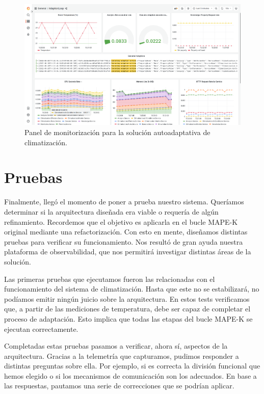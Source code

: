 \begin{landscape}

  \begin{figure}[htb]
    \centering
    \includegraphics[scale=0.37]{cap_despliegue/images/Grafana-panel-monitorizacion}
    \caption{Panel de monitorización para la solución autoadaptativa de climatización.}
    \label{fig:grafana-panel-monitorizacion}
  \end{figure}

\end{landscape}


\section{Pruebas}

Finalmente, llegó el momento de poner a prueba nuestro sistema. Queríamos determinar si la arquitectura diseñada era viable o requería de algún refinamiento. Recordemos que el objetivo es aplicarla en el bucle MAPE-K  original mediante una refactorización. Con esto en mente, diseñamos distintas pruebas para verificar su funcionamiento. Nos resultó de gran ayuda nuestra plataforma de observabilidad, que nos permitirá investigar distintas áreas de la solución.

Las primeras pruebas que ejecutamos fueron las relacionadas con el funcionamiento del sistema de climatización. Hasta que este no se estabilizará, no podíamos emitir ningún juicio sobre la arquitectura. En estos tests verificamos que, a partir de las mediciones de temperatura, debe ser capaz de completar el proceso de adaptación. Esto implica que todas las etapas del bucle MAPE-K se ejecutan correctamente.

Completadas estas pruebas pasamos a verificar, ahora sí, aspectos de la arquitectura. Gracias a la telemetría que capturamos, pudimos responder a distintas preguntas sobre ella. Por ejemplo, si es correcta la división funcional que hemos elegido o si los mecanismos de comunicación son los adecuados. En base a las respuestas, pautamos una serie de correcciones que se podrían aplicar.

